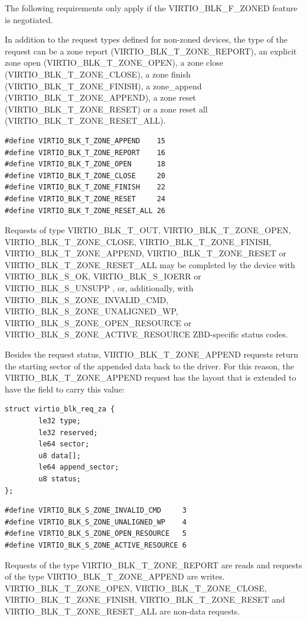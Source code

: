 The following requirements only apply if the VIRTIO_BLK_F_ZONED feature is
negotiated.

In addition to the request types defined for non-zoned devices, the type of the
request can be a zone report (VIRTIO_BLK_T_ZONE_REPORT), an explicit zone open
(VIRTIO_BLK_T_ZONE_OPEN), a zone close (VIRTIO_BLK_T_ZONE_CLOSE), a zone finish
(VIRTIO_BLK_T_ZONE_FINISH), a zone_append (VIRTIO_BLK_T_ZONE_APPEND), a zone
reset (VIRTIO_BLK_T_ZONE_RESET) or a zone reset all
(VIRTIO_BLK_T_ZONE_RESET_ALL).

\begin{lstlisting}
#define VIRTIO_BLK_T_ZONE_APPEND    15
#define VIRTIO_BLK_T_ZONE_REPORT    16
#define VIRTIO_BLK_T_ZONE_OPEN      18
#define VIRTIO_BLK_T_ZONE_CLOSE     20
#define VIRTIO_BLK_T_ZONE_FINISH    22
#define VIRTIO_BLK_T_ZONE_RESET     24
#define VIRTIO_BLK_T_ZONE_RESET_ALL 26
\end{lstlisting}

Requests of type VIRTIO_BLK_T_OUT, VIRTIO_BLK_T_ZONE_OPEN,
VIRTIO_BLK_T_ZONE_CLOSE, VIRTIO_BLK_T_ZONE_FINISH, VIRTIO_BLK_T_ZONE_APPEND,
VIRTIO_BLK_T_ZONE_RESET or VIRTIO_BLK_T_ZONE_RESET_ALL may be completed by the
device with VIRTIO_BLK_S_OK, VIRTIO_BLK_S_IOERR or VIRTIO_BLK_S_UNSUPP
, or, additionally, with  VIRTIO_BLK_S_ZONE_INVALID_CMD,
VIRTIO_BLK_S_ZONE_UNALIGNED_WP, VIRTIO_BLK_S_ZONE_OPEN_RESOURCE or
VIRTIO_BLK_S_ZONE_ACTIVE_RESOURCE ZBD-specific status codes.

Besides the request status, VIRTIO_BLK_T_ZONE_APPEND requests return the
starting sector of the appended data back to the driver. For this reason,
the VIRTIO_BLK_T_ZONE_APPEND request has the layout that is extended to have
the  field to carry this value:

\begin{lstlisting}
struct virtio_blk_req_za {
        le32 type;
        le32 reserved;
        le64 sector;
        u8 data[];
        le64 append_sector;
        u8 status;
};
\end{lstlisting}

\begin{lstlisting}
#define VIRTIO_BLK_S_ZONE_INVALID_CMD     3
#define VIRTIO_BLK_S_ZONE_UNALIGNED_WP    4
#define VIRTIO_BLK_S_ZONE_OPEN_RESOURCE   5
#define VIRTIO_BLK_S_ZONE_ACTIVE_RESOURCE 6
\end{lstlisting}

Requests of the type VIRTIO_BLK_T_ZONE_REPORT are reads and requests of the type
VIRTIO_BLK_T_ZONE_APPEND are writes. VIRTIO_BLK_T_ZONE_OPEN,
VIRTIO_BLK_T_ZONE_CLOSE, VIRTIO_BLK_T_ZONE_FINISH, VIRTIO_BLK_T_ZONE_RESET and
VIRTIO_BLK_T_ZONE_RESET_ALL are non-data requests.

